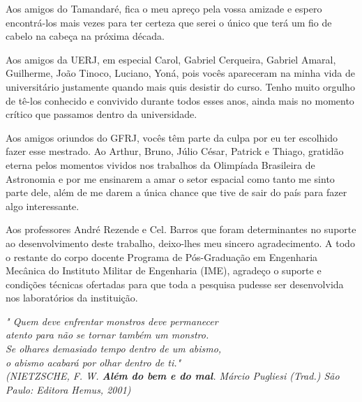 \begin{agradecimentos}
Aos amigos do Tamandaré, fica o meu apreço pela vossa amizade e espero encontrá-los mais vezes para ter certeza que serei o único que terá um fio de cabelo na cabeça na próxima década.

Aos amigos da UERJ, em especial Carol, Gabriel Cerqueira, Gabriel Amaral, Guilherme, João Tinoco, Luciano, Yoná, pois vocês apareceram na minha vida de universitário justamente quando mais quis desistir do curso. Tenho muito orgulho de tê-los conhecido e convivido durante todos esses anos, ainda mais no momento crítico que passamos dentro da universidade.

Aos amigos oriundos do GFRJ, vocês têm parte da culpa por eu ter escolhido fazer esse mestrado. Ao Arthur, Bruno, Júlio César, Patrick e Thiago, gratidão eterna pelos momentos vividos nos trabalhos da Olimpíada Brasileira de Astronomia e por me ensinarem a amar o setor espacial como tanto me sinto parte dele, além de me darem a única chance que tive de sair do país para fazer algo interessante. 

Aos professores André Rezende e Cel. Barros que foram determinantes no suporte ao desenvolvimento deste trabalho, deixo-lhes meu sincero agradecimento. A todo o restante do corpo docente Programa de Pós-Graduação em Engenharia Mecânica do Instituto Militar de Engenharia (IME), agradeço o suporte e condições técnicas ofertadas para que toda a pesquisa pudesse ser desenvolvida nos laboratórios da instituição.

\end{agradecimentos}

\begin{epigrafe}
    \vspace*{\fill}
	\begin{flushright}
		\textit{"
		Quem deve enfrentar monstros deve permanecer\\
		atento para não se tornar também um monstro. \\
		Se olhares demasiado tempo dentro de um abismo, \\
		o abismo acabará por olhar dentro de ti." \\
		(NIETZSCHE, F. W. \textbf{Além do bem e do mal}. Márcio Pugliesi (Trad.) São Paulo: Editora Hemus, 2001)}
	\end{flushright}
\end{epigrafe}


